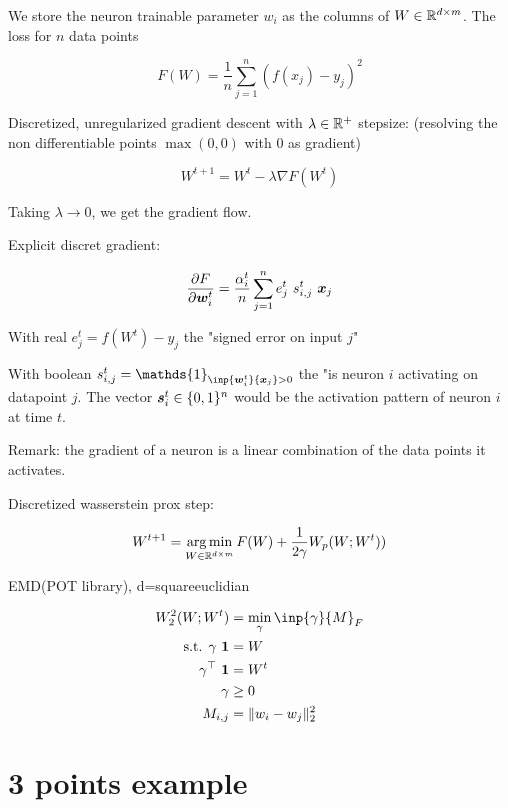 We store the neuron trainable parameter $w_i$ as the columns of $W \in \mathbb{R}^{d \times m}$. The loss for $n$ data points

\begin{equation}
	F(W) = \frac{1}{n} \sum_{j=1}^{n} \left(f(x_j) - y_j\right)^2
\end{equation}

Discretized, unregularized gradient descent with $\lambda \in \mathbb{R}^+$ stepsize: (resolving the non differentiable points $\max(0, 0)$ with 0 as gradient)

\begin{equation}
	W^{t+1} = W^t - \lambda \nabla F(W^t)
\end{equation}

Taking $\lambda \rightarrow 0$, we get the gradient flow.

Explicit discret gradient:

\begin{equation}
	\frac{\partial F}{\partial {\bm{w}}^t_i} = \frac{\alpha^t_i}{n} \sum_{j=1}^{n} e^t_j ~ s^t_{i, j} ~ {\bm{x}}_j
\end{equation}

With real $e^t_j = f(W^t) - y_j$ the "signed error on input $j$"

With boolean $s^t_{i, j} = \mathds{1}_{\inp{\vw^t_i}{\vx_j} > 0}$ the "is neuron $i$ activating on datapoint $j$. The vector ${\bm{s}}^t_{i} \in \{0, 1\}^n$ would be the activation pattern of neuron $i$ at time $t$.

Remark: the gradient of a neuron is a linear combination of the data points it activates.

Discretized wasserstein prox step:

\begin{equation}
	W^{t+1} = \operatorname*{arg\,min}_{W \in \mathbb{R}^{d \times m}} F(W) + \frac{1}{2 \gamma} W_p(W; W^t))
\end{equation}


EMD(POT library), d=squareeuclidian

\begin{align}
	W_2^2(W; W^t) &= \min_{\gamma} \inp{\gamma}{M}_F \\
	\text{s.t.  } \gamma ~ \mathbf{1} &= W \\
	\gamma^\top ~ \mathbf{1} &= W^t \\
	\gamma &\geq 0 \\
	M_{i, j} &= \lVert w_i - w_j \rVert^2_2
\end{align}

\section{3 points example}

